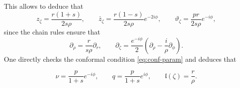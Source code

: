\documentclass[reqno]{amsart}
\numberwithin{equation}{section}
\theoremstyle{definition}
\theoremstyle{remark}
\providecommand{\ellm}{\mathfrak l}
\begin{document}
This allows to deduce that 
\begin{equation}\label{eq:radial-derivatives}
        z_\zeta=\frac{r(1+s)}{2s\rho},
        \qquad
        \bar z_\zeta=\frac{r(1-s)}{2s\rho}e^{-2i\phi},
        \qquad
        \vartheta_\zeta=\frac{pr}{2s\rho}e^{-i\phi},
\end{equation}
since the chain rules ensure that 
\begin{equation}\label{eq:radial-partial-rho}
        \partial_\rho=\frac{r}{s\rho}\partial_r,
        \qquad
        \partial_\zeta=\frac{e^{-i\phi}}2\left(\partial_\rho-\frac{i}{\rho}\partial_\phi\right).
\end{equation}
One directly checks the conformal condition \eqref{eq:conf-param} and deduces that 

\begin{equation}\label{eq:radial-q}
        \nu=\frac{p}{1+s}e^{-i\phi},
        \qquad
        q=\frac{p}{1+s}e^{i\phi},
        \qquad
        \ellm(\zeta)=\frac r\rho.
\end{equation}
\end{document}
